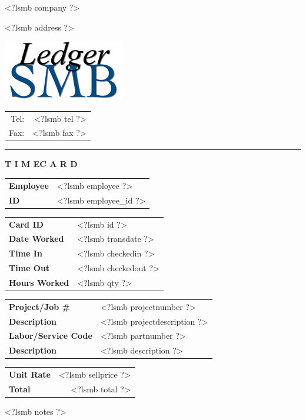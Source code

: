 \documentclass{scrartcl}
\begin{document}
\pagestyle{myheadings}
\thispagestyle{empty}

\fontsize{10pt}{12pt}\selectfont

\vspace*{-1.3cm}

\parbox{\textwidth}{%
  \parbox[b]{.42\textwidth}{%
    <?lsmb company ?>
   
    <?lsmb address ?>
  }
  \parbox[b]{.2\textwidth}{
    \includegraphics[scale=0.3]{ledger-smb}
  }\hfill
  \begin{tabular}[b]{rr@{}}
  Tel: & <?lsmb tel ?>\\
  Fax: & <?lsmb fax ?>
  \end{tabular}

  \rule[1.5em]{\textwidth}{0.5pt}
}

\centerline{\textbf{T I M E}\hspace{0.5cm}\textbf{C A R D}}

\vspace*{0.5cm}

\begin{tabular}[t]{ll}
  \textbf{Employee} & <?lsmb employee ?> \\
  \textbf{ID} & <?lsmb employee_id ?> \\
\end{tabular}
\hfill
\begin{tabular}[t]{ll}
  \textbf{Card ID} & <?lsmb id ?> \\
  \textbf{Date Worked} & <?lsmb transdate ?> \\
  \textbf{Time In} & <?lsmb checkedin ?> \\
  \textbf{Time Out} & <?lsmb checkedout ?> \\
  \textbf{Hours Worked} & <?lsmb qty ?> \\
\end{tabular}

\vspace{1cm}

\begin{tabular}[b]{ll}
  \textbf{Project/Job \#} & <?lsmb projectnumber ?> \\
  \textbf{Description} & <?lsmb projectdescription ?> \\
  \textbf{Labor/Service Code} & <?lsmb partnumber ?> \\
  \textbf{Description} & <?lsmb description ?> \\
\end{tabular}
\hfill
\begin{tabular}[b]{lr}
  \textbf{Unit Rate} & <?lsmb sellprice ?> \\
  \textbf{Total} & <?lsmb total ?> \\
\end{tabular}
  
\vspace{0.3cm}

<?lsmb notes ?>
 
\end{document}
